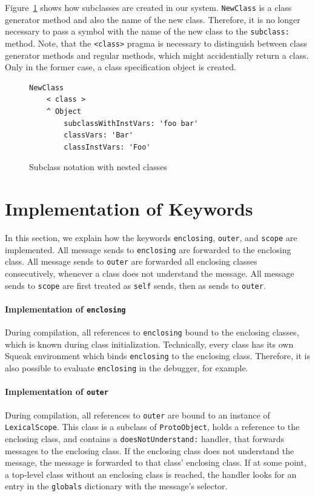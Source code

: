 Figure~\ref{fig:impl_subclass_nested} shows how subclasses are created in our system. \texttt{NewClass} is a class generator method and also the name of the new class. Therefore, it is no longer necessary to pass a symbol with the name of the new class to the \texttt{subclass:} method. Note, that the \texttt{<class>} pragma is necessary to distinguish between class generator methods and regular methods, which might accidentially return a class. Only in the former case, a class specification object is created.

\begin{figure}[!htp]
\begin{lstlisting}
NewClass
    < class >
    ^ Object 
        subclassWithInstVars: 'foo bar'
        classVars: 'Bar'
        classInstVars: 'Foo'
\end{lstlisting}
\caption{Subclass notation with nested classes}
\label{fig:impl_subclass_nested}
\end{figure}

\section{Implementation of Keywords}
\label{sec:impl_keywords}
In this section, we explain how the keywords \texttt{enclosing}, \texttt{outer}, and \texttt{scope} are implemented. All message sends to \texttt{enclosing} are forwarded to the enclosing class. All message sends to \texttt{outer} are forwarded all enclosing classes consecutively, whenever a class does not understand the message. All message sends to \texttt{scope} are first treated as \texttt{self} sends, then as sends to \texttt{outer}.

\paragraph{Implementation of \texttt{enclosing}}
During compilation, all references to \texttt{enclosing} bound to the enclosing classes, which is known during class initialization. Technically, every class has its own Squeak environment which binds \texttt{enclosing} to the enclosing class. Therefore, it is also possible to evaluate \texttt{enclosing} in the debugger, for example.

\paragraph{Implementation of \texttt{outer}}
During compilation, all references to \texttt{outer} are bound to an instance of \texttt{LexicalScope}. This class is a subclass of \texttt{ProtoObject}, holds a reference to the enclosing class, and contains a \texttt{doesNotUnderstand:} handler, that forwards messages to the enclosing class. If the enclosing class does not understand the message, the message is forwarded to that class' enclosing class. If at some point, a top-level class without an enclosing class is reached, the handler looks for an entry in the \texttt{globals} dictionary with the message's selector.

